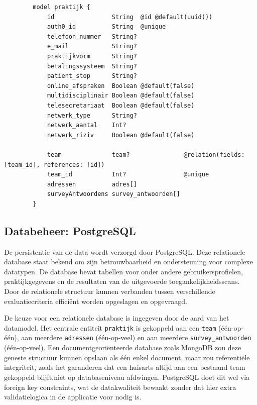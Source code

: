 \begin{listing}[H]
    \begin{verbatim}
        model praktijk {
            id                String  @id @default(uuid())
            auth0_id          String  @unique
            telefoon_nummer   String?
            e_mail            String?
            praktijkvorm      String?
            betalingssysteem  String?
            patient_stop      String?
            online_afspraken  Boolean @default(false)
            multidisciplinair Boolean @default(false)
            telesecretariaat  Boolean @default(false)
            netwerk_type      String?
            netwerk_aantal    Int?
            netwerk_riziv     Boolean @default(false)

            team              team?               @relation(fields: [team_id], references: [id])
            team_id           Int?                @unique
            adressen          adres[]
            surveyAntwoordens survey_antwoorden[]
        }
    \end{verbatim}
    \caption[Modeldefinitie praktijk in prisma]{Modeldefinitie praktijk in prisma}
\end{listing}


\subsection{Databeheer: PostgreSQL}
\label{subsec:postrgesql}

De persistentie van de data wordt verzorgd door PostgreSQL. 
Deze relationele database staat bekend om zijn betrouwbaarheid en ondersteuning voor complexe datatypen. 
De database bevat tabellen voor onder andere gebruikersprofielen, praktijkgegevens en de resultaten van de uitgevoerde toegankelijkheidsscans. 
Door de relationele structuur kunnen verbanden tussen verschillende evaluatiecriteria efficiënt worden opgeslagen en opgevraagd.
\medskip

De keuze voor een relationele database is ingegeven door de aard van het datamodel.
Het centrale entiteit \texttt{praktijk} is gekoppeld aan een \texttt{team} (één-op-één), aan meerdere \texttt{adressen} (één-op-veel) en aan meerdere \texttt{survey\_antwoorden} (één-op-veel).
Een documentgeoriënteerde database zoals MongoDB zou deze geneste structuur kunnen opslaan als één enkel document, maar zou referentiële integriteit, zoals het garanderen dat een huisarts altijd aan een bestaand team gekoppeld blijft,niet op databaseniveau afdwingen.
PostgreSQL doet dit wel via foreign key constraints, wat de datakwaliteit bewaakt zonder dat hier extra validatielogica in de applicatie voor nodig is.

